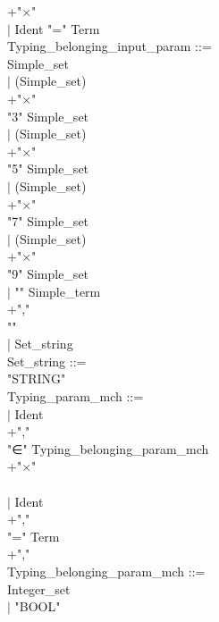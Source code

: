 \documentclass[12pt,a4paper,draft]{report}
\begin{document}
{\begin{sloppypar}
+"$\times$"\\ 
\hspace*{0.20in} $|$ Ident  "="  Term\\ 
Typing\_belonging\_input\_param ::= \\ 
   Simple\_set\\ 
\hspace*{0.20in} $|$ (Simple\_set)\\ 
 +"$\times$"\\ 
  "3"  Simple\_set  \\ 
\hspace*{0.20in} $|$ (Simple\_set)\\ 
 +"$\times$"\\ 
  "5"  Simple\_set\\ 
\hspace*{0.20in} $|$ (Simple\_set)\\ 
 +"$\times$"\\ 
  "7"  Simple\_set\\ 
\hspace*{0.20in} $|$ (Simple\_set)\\ 
+"$\times$"\\ 
  "9"  Simple\_set\\ 
\hspace*{0.20in} $|$ "{" Simple\_term\\ 
+","\\ 
 "}"\\ 
| Set\_string\\ 
Set\_string ::= \\ 
  "STRING" \\ 
Typing\_param\_mch ::= \\ 
\hspace*{0.20in} $|$ Ident\\ 
+","\\ 
  "∈"  Typing\_belonging\_param\_mch\\ 
+"$\times$"\\ 
  \\ 
\hspace*{0.20in} $|$ Ident\\ 
+","\\ 
  "="  Term\\ 
+","\\ 
Typing\_belonging\_param\_mch ::= \\ 
\hspace*{0.20in}   Integer\_set\\ 
\hspace*{0.20in} $|$ "BOOL" \\ 

\end{sloppypar}}
\end{document}
